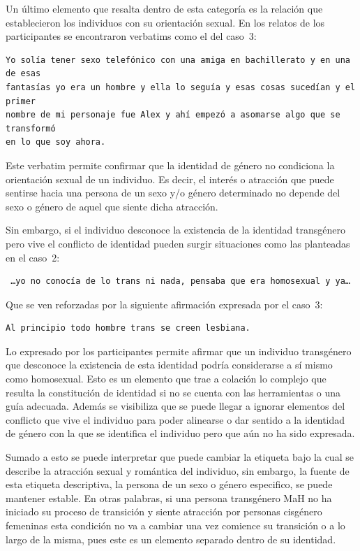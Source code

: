 Un último elemento que resalta dentro de esta categoría es la relación que
establecieron los individuos con su orientación sexual. En los relatos de los
participantes se encontraron verbatims como el del caso~3:

\begin{verbatim}
Yo solía tener sexo telefónico con una amiga en bachillerato y en una de esas
fantasías yo era un hombre y ella lo seguía y esas cosas sucedían y el primer
nombre de mi personaje fue Alex y ahí empezó a asomarse algo que se transformó
en lo que soy ahora.
\end{verbatim}

Este verbatim permite confirmar que la identidad de género no condiciona la
orientación sexual de un individuo. Es decir, el interés o atracción que puede
sentirse hacia una persona de un sexo y/o género determinado no depende del sexo
o género de aquel que siente dicha atracción.

Sin embargo, si el individuo desconoce la existencia de la identidad transgénero
pero vive el conflicto de identidad pueden surgir situaciones como las
planteadas en el caso~2:

\begin{verbatim}
 …yo no conocía de lo trans ni nada, pensaba que era homosexual y ya…
\end{verbatim}

Que se ven reforzadas por la siguiente afirmación expresada por el caso~3:

\begin{verbatim}
Al principio todo hombre trans se creen lesbiana.
\end{verbatim}

Lo expresado por los participantes permite afirmar que un individuo transgénero
que desconoce la existencia de esta identidad podría considerarse a sí mismo como
homosexual. Esto es un elemento que trae a colación lo complejo que resulta la
constitución de identidad si no se cuenta con las herramientas o una guía
adecuada. Además se visibiliza que se puede llegar a ignorar elementos del
conflicto que vive el individuo para poder alinearse o dar sentido a la
identidad de género con la que se identifica el individuo pero que aún no ha
sido expresada.

Sumado a esto se puede interpretar que puede cambiar la etiqueta bajo la cual se
describe la atracción sexual y romántica del individuo, sin embargo, la fuente
de esta etiqueta descriptiva, la persona de un sexo o género especifico, se
puede mantener estable. En otras palabras, si una persona transgénero MaH no ha
iniciado su proceso de transición y siente atracción por personas cisgénero
femeninas esta condición no va a cambiar una vez comience su transición o
a lo largo de la misma, pues este es un elemento separado dentro de su
identidad.

